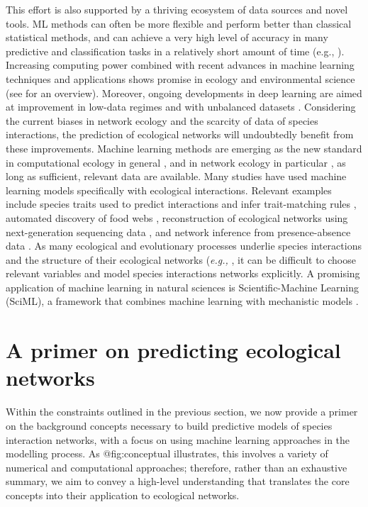 This effort is also supported by a thriving ecosystem of data sources
and novel tools. ML methods can often be more flexible and perform
better than classical statistical methods, and can achieve a very high
level of accuracy in many predictive and classification tasks in a
relatively short amount of time (e.g., \cite{Cutler2007RanFor,
Krizhevsky2017ImaCla}). Increasing computing power combined with
recent advances in machine learning techniques and applications shows
promise in ecology and environmental science (see \cite{Christin2019AppDee}
for an overview). Moreover, ongoing developments in deep learning are
aimed at improvement in low-data regimes and with unbalanced datasets
\cite{Antoniou2018DatAug, Chawla2010DatMin}. Considering the current
biases in network ecology \cite{Poisot2021GloKno} and the scarcity of
data of species interactions, the prediction of ecological networks will
undoubtedly benefit from these improvements. Machine learning methods
are emerging as the new standard in computational ecology in general
\cite{Olden2008MacLea, Christin2019AppDee}, and in network ecology in
particular \cite{Bohan2017NexGlo}, as long as sufficient, relevant data
are available. Many studies have used machine learning models
specifically with ecological interactions. Relevant examples include
species traits used to predict interactions and infer trait-matching
rules \cite{Desjardins-Proulx2017EcoInt, Pichler2020MacLea}, automated
discovery of food webs \cite{Bohan2011AutDis}, reconstruction of
ecological networks using next-generation sequencing data
\cite{Bohan2017NexGlo}, and network inference from presence-absence data
\cite{Sander2017EcoNet}. As many ecological and evolutionary processes
underlie species interactions and the structure of their ecological
networks (\emph{e.g.,} \cite{Vazquez2009UniPat, Segar2020RolEvo}, it can be
difficult to choose relevant variables and model species interactions
networks explicitly. A promising application of machine learning in
natural sciences is Scientific-Machine Learning (SciML), a framework
that combines machine learning with mechanistic models
\cite{Chuang2018AdvCon, Rackauckas2020UniDif}.

\section{A primer on predicting ecological
networks}\label{a-primer-on-predicting-ecological-networks}

Within the constraints outlined in the previous section, we now provide
a primer on the background concepts necessary to build predictive models
of species interaction networks, with a focus on using machine learning
approaches in the modelling process. As @fig:conceptual illustrates,
this involves a variety of numerical and computational approaches;
therefore, rather than an exhaustive summary, we aim to convey a
high-level understanding that translates the core concepts into their
application to ecological networks.

